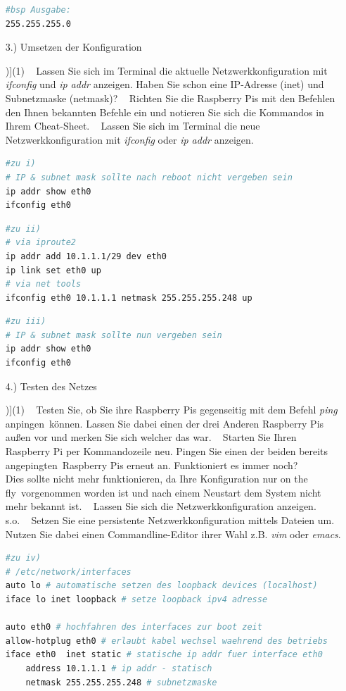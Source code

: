 \documentclass[paper=a4,fontsize=11pt]{scrartcl}%
\numberwithin{equation}{section}
\begin{document}
\begin{itemize}
\begin{lstlisting}[style=Bash, language=Bash]
#bsp Ausgabe:
255.255.255.0
	\end{lstlisting}
	\item[3.)] Umsetzen der Konfiguration
\begin{tasks}[counter-format=(tsk[r])](1)
	\task~ Lassen Sie sich im Terminal die aktuelle Netzwerkkonfiguration mit \emph{ifconfig} und \emph{ip addr} anzeigen. Haben Sie schon eine IP-Adresse (inet) und Subnetzmaske (netmask)?
	\task~ Richten Sie die Raspberry Pis mit den Befehlen den Ihnen bekannten Befehle ein und notieren Sie sich die Kommandos in Ihrem Cheat-Sheet.
	\task~ Lassen Sie sich im Terminal die neue Netzwerkkonfiguration mit \emph{ifconfig} oder \emph{ip addr} anzeigen.
\end{tasks}
\begin{lstlisting}[style=Bash, language=Bash]
#zu i)
# IP & subnet mask sollte nach reboot nicht vergeben sein
ip addr show eth0
ifconfig eth0
	\end{lstlisting}
		\begin{lstlisting}[style=Bash, language=Bash]
#zu ii)
# via iproute2
ip addr add 10.1.1.1/29 dev eth0
ip link set eth0 up
# via net tools
ifconfig eth0 10.1.1.1 netmask 255.255.255.248 up
	\end{lstlisting}
	\begin{lstlisting}[style=Bash, language=Bash]
#zu iii)
# IP & subnet mask sollte nun vergeben sein
ip addr show eth0
ifconfig eth0
	\end{lstlisting}
\item[4.)] Testen des Netzes
\begin{tasks}[counter-format=(tsk[r])](1)
	\task~ Testen Sie, ob Sie ihre Raspberry Pis gegenseitig mit dem Befehl \emph{ping} \glqq anpingen\grqq\ können. Lassen Sie dabei einen der drei Anderen Raspberry Pis außen vor und merken Sie sich welcher das war.
	\task~ Starten Sie Ihren Raspberry Pi per Kommandozeile neu. Pingen Sie einen der beiden bereits \glqq angepingten\grqq\ Raspberry Pis erneut an. Funktioniert es immer noch?\\
	Dies sollte nicht mehr funktionieren, da Ihre Konfiguration nur \glqq on the fly\grqq\ vorgenommen worden ist und nach einem Neustart dem System nicht mehr bekannt ist.
	\task~ Lassen Sie sich die Netzwerkkonfiguration anzeigen.\\
	s.o.
	\task~ Setzen Sie eine persistente Netzwerkkonfiguration mittels Dateien um. Nutzen Sie dabei einen Commandline-Editor ihrer Wahl z.B. \emph{vim} oder \emph{emacs}.
\end{tasks}
\begin{lstlisting}[style=Bash, language=Bash]
#zu iv)
# /etc/network/interfaces
auto lo # automatische setzen des loopback devices (localhost)
iface lo inet loopback # setze loopback ipv4 adresse

auto eth0 # hochfahren des interfaces zur boot zeit
allow-hotplug eth0 # erlaubt kabel wechsel waehrend des betriebs
iface eth0  inet static # statische ip addr fuer interface eth0
	address 10.1.1.1 # ip addr - statisch
	netmask 255.255.255.248 # subnetzmaske
	\end{lstlisting}
\end{itemize}
\end{document}
